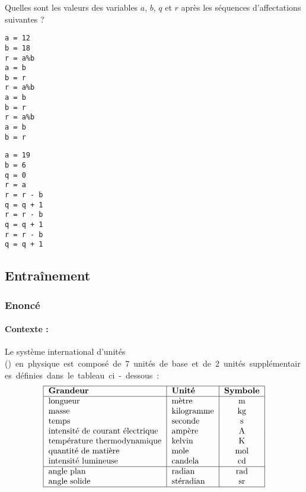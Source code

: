 \begin{question}
Quelles sont les valeurs des variables $a$, $b$, $q$ et $r$ après les séquences d'affectations suivantes ?

\begin{minipage}[t]{7cm}\em 
\begin{Verbatim}
a = 12 
b = 18
r = a%b
a = b
b = r
r = a%b
a = b
b = r
r = a%b
a = b
b = r
\end{Verbatim}
\end{minipage}
\hfill
\begin{minipage}[t]{7cm}\em 
\begin{Verbatim}
a = 19
b = 6
q = 0
r = a
r = r - b
q = q + 1
r = r - b
q = q + 1
r = r - b
q = q + 1
\end{Verbatim}
\end{minipage}


\end{question}


\subsection{Entraînement}

\subsubsection{Enoncé}
\paragraph{Contexte :} Le système international d'unités (\si) en physique est 
composé de 7 unités de base et de 2 unités supplémentaires définies dans le
tableau ci-dessous :
{\footnotesize
$$\begin{tabular}{|l|l|c|}
\hline
\textbf{Grandeur} & \textbf{Unité} & \textbf{Symbole}\\ 
\hline 
longueur						& mètre			& m \\ 
masse 							& kilogramme	& kg \\ 
temps							& seconde		& s \\ 
intensité de courant électrique & ampère		& A \\ 
température thermodynamique 	& kelvin		& K \\ 
quantité de matière 			& mole			& mol \\ 
intensité lumineuse 			& candela		& cd \\ 
\hline 
angle plan 						& radian		& rad \\ 
angle solide					& stéradian		& sr \\ 
\hline 
\end{tabular}$$}

